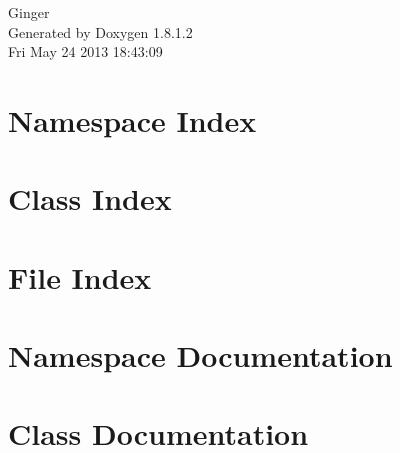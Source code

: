 \documentclass{book}
\begin{document}
\hypersetup{pageanchor=false,citecolor=blue}
\begin{titlepage}
\vspace*{7cm}
\begin{center}
{\Large Ginger }\\
\vspace*{1cm}
{\large Generated by Doxygen 1.8.1.2}\\
\vspace*{0.5cm}
{\small Fri May 24 2013 18:43:09}\\
\end{center}
\end{titlepage}
\clearemptydoublepage
{}
\tableofcontents
\clearemptydoublepage
{}
\hypersetup{pageanchor=true,citecolor=blue}
\chapter{Namespace Index}

\chapter{Class Index}

\chapter{File Index}

\chapter{Namespace Documentation}

\chapter{Class Documentation}





\end{document}

